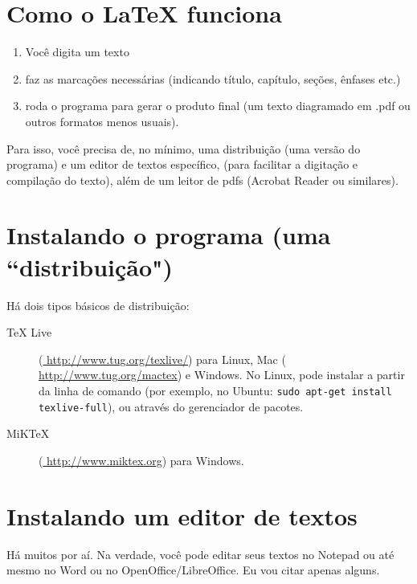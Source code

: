 \documentclass[a4paper,numbers=noenddot,abstract,DIV=calc]{scrbook} %
\begin{document}
\section{Como o \LaTeX{} funciona}
 
 \begin{enumerate}
 \item  Você digita um texto \item faz as marcações necessárias (indicando título, capítulo, seções, ênfases etc.) \item  roda o programa para gerar o produto final (um texto diagramado em .pdf ou outros formatos menos usuais).
 \end{enumerate}


Para isso, você precisa de, no mínimo, uma distribuição (uma versão do programa) e um editor de textos específico,  (para facilitar a digitação e compilação do texto), além de um leitor de pdfs (Acrobat Reader ou similares).



\section{Instalando o programa (uma ``distribuição")}
\label{distribuicoes}
Há dois tipos básicos de distribuição:
\begin{description}
\item [TeX Live] (\url{ http://www.tug.org/texlive/}) para Linux, Mac  (\url{ http://www.tug.org/mactex}) e Windows. No Linux, pode instalar a partir da linha de comando (por exemplo, no Ubuntu: \texttt{sudo apt-get install texlive-full}), ou através do gerenciador de pacotes. 
\item[MiKTeX]  (\url{ http://www.miktex.org}) para Windows.

\end{description}

\section{Instalando um editor de textos}
Há muitos por aí. Na verdade, você pode editar seus textos no Notepad ou até mesmo no Word ou no OpenOffice/LibreOffice.  Eu vou citar apenas alguns.
\end{document}
